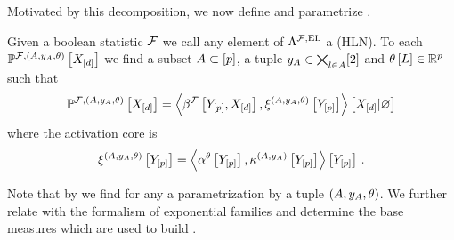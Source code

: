 Motivated by this decomposition, we now define and parametrize \HybridLogicNetworks{}.

\begin{definition}[\HybridLogicNetwork{}]
    \label{def:hybridLogicNetwork}
    Given a boolean statistic $\mathcal{F}$ we call any element of $\Lambda^{\mathcal{F},\mathrm{EL}}$ a \HybridLogicNetwork{} (HLN).
    To each \HybridLogicNetwork{} $\mathbb{P}^{\mathcal{F},(A,y_{A},\theta)}\left[X_{[d]}\right]$ we find a subset $A\subset[p]$, a tuple $y_{A}\in\bigtimes_{l\in A}[2]$ and $\theta\left[L\right]\in\mathbb{R}^{p}$ such that
    \begin{align*}
        \mathbb{P}^{\mathcal{F},(A,y_{A},\theta)}\left[X_{[d]}\right]
        = \left\langle \beta^{\mathcal{F}}\left[Y_{[p]},X_{[d]}\right],\xi^{(A,y_{A},\theta)}\left[Y_{[p]}\right]\right\rangle \left[ X_{[d]} | \varnothing \right]
    \end{align*}
    where the activation core is
    \begin{align*}
        \xi^{(A,y_{A},\theta)}\left[Y_{[p]}\right] = \left\langle \alpha^\theta\left[Y_{[p]}\right],\kappa^{(A,y_{A})}\left[Y_{[p]}\right]\right\rangle \left[ Y_{[p]} \right] \, .
    \end{align*}
\end{definition}

Note that by  we find for any \HybridLogicNetwork{} a parametrization by a tuple $(A,y_{A},\theta)$.
We further relate with the formalism of exponential families and determine the base measures which are used to build \HybridLogicNetworks{}.

